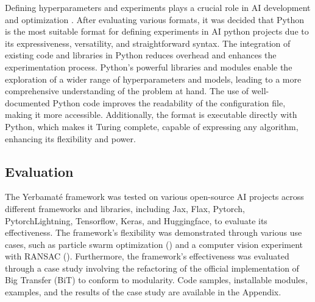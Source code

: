Defining hyperparameters and experiments plays a crucial role in AI development and optimization \cite{wu2019hyperparameter}. After evaluating various formats, it was decided that Python is the most suitable format for defining experiments in AI python projects due to its expressiveness, versatility, and straightforward syntax. The integration of existing code and libraries in Python reduces overhead and enhances the experimentation process. Python's powerful libraries and modules enable the exploration of a wider range of hyperparameters and models, leading to a more comprehensive understanding of the problem at hand. The use of well-documented Python code improves the readability of the configuration file, making it more accessible. Additionally, the format is executable directly with Python, which makes it Turing complete, capable of expressing any algorithm, enhancing its flexibility and power.




\subsection{Evaluation}

The Yerbamaté framework was tested on various open-source AI projects across different frameworks and libraries, including Jax, Flax, Pytorch, Pytorch\-Lightning, Tensorflow, Keras, and Huggingface, to evaluate its effectiveness. The framework's flexibility was demonstrated through various use cases, such as particle swarm optimization (\cite{kennedy1995particle}) and a computer vision experiment with RANSAC (\cite{lowe2004distinctive}). Furthermore, the framework's effectiveness was evaluated through a case study involving the refactoring of the official implementation of Big Transfer (BiT) to conform to modularity. Code samples, installable modules, examples, and the results of the case study are available in the Appendix.
